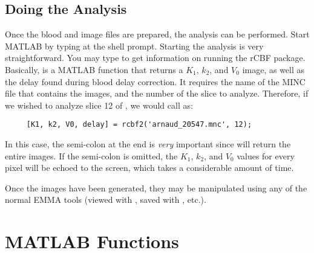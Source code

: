 \subsection{Doing the Analysis}

Once the blood and image files are prepared, the analysis can be
performed.  Start MATLAB by typing  at the shell prompt.
Starting the analysis is very straightforward.  You may type
 to get information on running the rCBF package.
Basically,  is a MATLAB function that returns a $K_1$,
$k_2$, and $V_0$ image, as well as the delay found during blood delay
correction.  It requires the name of the MINC file that contains the
images, and the number of the slice to analyze.  Therefore, if we
wished to analyze slice 12 of , we would call
 as:
%
\begin{verbatim}
     [K1, k2, V0, delay] = rcbf2('arnaud_20547.mnc', 12);
\end{verbatim}
%
In this case, the semi-colon at the end is {\em very} important since
 will return the entire images.  If the semi-colon is
omitted, the $K_1$, $k_2$, and $V_0$ values for every pixel will be
echoed to the screen, which takes a considerable amount of time.

Once the images have been generated, they may be manipulated using
any of the normal EMMA tools (viewed with , saved
with , etc.).





\newpage
\section{MATLAB Functions}










